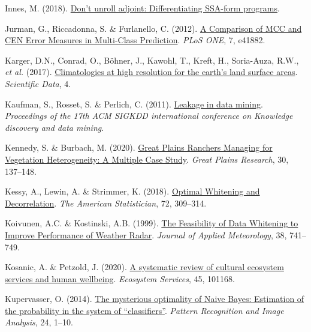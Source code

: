 \documentclass[
  letterpaper,
]{scrbook}
\newlength{\cslhangindent}
\newenvironment{CSLReferences}[2] %
 {\begin{list}{}{%
  \setlength{\itemindent}{0pt}
  \setlength{\leftmargin}{0pt}
  \setlength{\parsep}{0pt}
  \ifodd #1
   \setlength{\leftmargin}{\cslhangindent}
   \setlength{\itemindent}{-1\cslhangindent}
  \fi
  \setlength{\itemsep}{#2\baselineskip}}}
 {\end{list}}
\begin{document}
\begin{CSLReferences}{1}{0}
Innes, M. (2018). \href{https://doi.org/10.48550/ARXIV.1810.07951}{Don't
unroll adjoint: Differentiating SSA-form programs}.

Jurman, G., Riccadonna, S. \& Furlanello, C. (2012).
\href{https://doi.org/10.1371/journal.pone.0041882}{A Comparison of MCC
and CEN Error Measures in Multi-Class Prediction}. \emph{PLoS ONE}, 7,
e41882.

Karger, D.N., Conrad, O., Böhner, J., Kawohl, T., Kreft, H., Soria-Auza,
R.W., \emph{et al.} (2017).
\href{https://doi.org/10.1038/sdata.2017.122}{Climatologies at high
resolution for the earth{'}s land surface areas}. \emph{Scientific
Data}, 4.

Kaufman, S., Rosset, S. \& Perlich, C. (2011).
\href{https://doi.org/10.1145/2020408.2020496}{Leakage in data mining}.
\emph{Proceedings of the 17th ACM SIGKDD international conference on
Knowledge discovery and data mining}.

Kennedy, S. \& Burbach, M. (2020).
\href{https://doi.org/10.1353/gpr.2020.0016}{Great Plains Ranchers
Managing for Vegetation Heterogeneity: A Multiple Case Study}.
\emph{Great Plains Research}, 30, 137--148.

Kessy, A., Lewin, A. \& Strimmer, K. (2018).
\href{https://doi.org/10.1080/00031305.2016.1277159}{Optimal Whitening
and Decorrelation}. \emph{The American Statistician}, 72, 309--314.

Koivunen, A.C. \& Kostinski, A.B. (1999).
\href{https://doi.org/10.1175/1520-0450(1999)038\%3C0741:tfodwt\%3E2.0.co;2}{The
Feasibility of Data Whitening to Improve Performance of Weather Radar}.
\emph{Journal of Applied Meteorology}, 38, 741--749.

Kosanic, A. \& Petzold, J. (2020).
\href{https://doi.org/10.1016/j.ecoser.2020.101168}{A systematic review
of cultural ecosystem services and human wellbeing}. \emph{Ecosystem
Services}, 45, 101168.

Kupervasser, O. (2014).
\href{https://doi.org/10.1134/s1054661814010088}{The mysterious
optimality of Naive Bayes: Estimation of the probability in the system
of {``}classifiers{''}}. \emph{Pattern Recognition and Image Analysis},
24, 1--10.


\end{CSLReferences}
\end{document}
